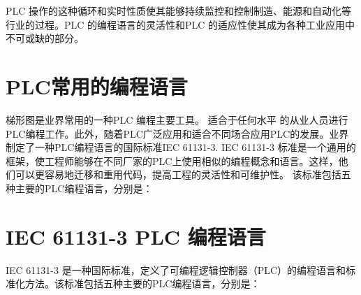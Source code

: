 \documentclass{book}
\begin{document}
PLC 操作的这种循环和实时性质使其能够持续监控和控制制造、能源和自动化等行业的过程。PLC 的编程语言的灵活性和PLC 的适应性使其成为各种工业应用中不可或缺的部分。

	\section{PLC常用的编程语言} 
	梯形图是业界常用的一种PLC 编程主要工具。 适合于任何水平 的从业人员进行PLC编程工作。此外，随着PLC广泛应用和适合不同场合应用PLC的发展。业界制定了一种PLC编程语言的国际标准IEC 61131-3.
	IEC 61131-3 标准是一个通用的框架，使工程师能够在不同厂家的PLC上使用相似的编程概念和语言。这样，他们可以更容易地迁移和重用代码，提高工程的灵活性和可维护性。
	该标准包括五种主要的PLC编程语言，分别是：
 
	
	\section*{IEC 61131-3 PLC 编程语言}
	
	IEC 61131-3 是一种国际标准，定义了可编程逻辑控制器（PLC）的编程语言和标准化方法。该标准包括五种主要的PLC编程语言，分别是：
	
\end{document}
